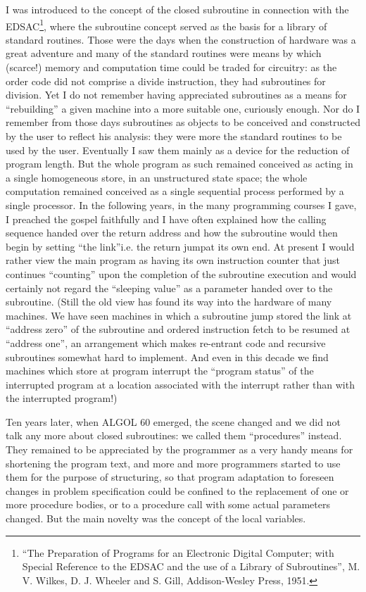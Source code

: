 I was introduced to the concept of the closed subroutine in connection with the EDSAC\footnote{``The Preparation of Programs for an Electronic Digital Computer; with Special Reference to the EDSAC and the use of a Library of Subroutines'', M. V. Wilkes, D. J. Wheeler and S. Gill, Addison-Wesley Press, 1951.}, where the subroutine concept served as the basis for a library of standard routines. Those were the days when the construction of hardware was a great adventure and many of the standard routines were means by which (scarce!) memory and computation time could be traded for circuitry: as the order code did not comprise a divide instruction, they had subroutines for division. Yet I do not remember having appreciated subroutines as a means for ``rebuilding'' a given machine into a more suitable one, curiously enough. Nor do I remember from those days subroutines as objects to be conceived and constructed by the user to reflect his analysis: they were more the standard routines to be used by the user. Eventually I saw them mainly as a device for the reduction of program length. But the whole program as such remained conceived as acting in a single homogeneous store, in an unstructured state space; the whole computation remained conceived as a single sequential process performed by a single processor. In the following years, in the many programming courses I gave, I preached the gospel faithfully and I have often explained how the calling sequence handed over the return address and how the subroutine would then begin by setting ``the link''\textemdash{}i.e. the return jump\textemdash{}at its own end. At present I would rather view the main program as having its own instruction counter that just continues ``counting'' upon the completion of the subroutine execution and would certainly not regard the ``sleeping value'' as a parameter handed over to the subroutine. (Still the old view has found its way into the hardware of many machines. We have seen machines in which a subroutine jump stored the link at ``address zero'' of the subroutine and ordered instruction fetch to be resumed at ``address one'', an arrangement which makes re-entrant code and recursive subroutines somewhat hard to implement. And even in this decade we find machines which store at program interrupt the ``program status'' of the interrupted program at a location associated with the interrupt rather than with the interrupted program!)

Ten years later, when ALGOL 60 emerged, the scene changed and we did not talk any more about closed subroutines: we called them ``procedures'' instead. They remained to be appreciated by the programmer as a very handy means for shortening the program text, and more and more programmers started to use them for the purpose of structuring, so that program adaptation to foreseen changes in problem specification could be confined to the replacement of one or more procedure bodies, or to a procedure call with some actual parameters changed. But the main novelty was the concept of the local variables.

